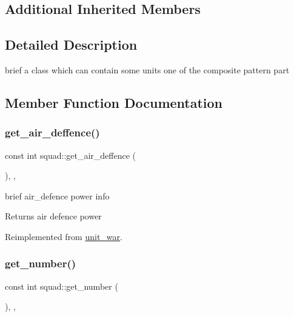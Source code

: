 \subsection*{Additional Inherited Members}


\subsection{Detailed Description}
brief a class which can contain some units one of the composite pattern part 

\subsection{Member Function Documentation}
\mbox{\label{classsquad_ac3655293ec84ecdecd668b6bc0b76ec6}} 
\subsubsection{\texorpdfstring{get\+\_\+air\+\_\+deffence()}{get\_air\_deffence()}}
{\footnotesize\ttfamily const int squad\+::get\+\_\+air\+\_\+deffence (\begin{DoxyParamCaption}{ }\end{DoxyParamCaption})\hspace{0.3cm}{\ttfamily [inline]}, {\ttfamily [override]}, {\ttfamily [virtual]}}

brief air\+\_\+defence power info \begin{DoxyReturn}{Returns}
air defence power 
\end{DoxyReturn}


Reimplemented from \mbox{\hyperlink{classunit__war_af26f2da420a828230a329339bc9ef805}{unit\+\_\+war}}.

\mbox{\label{classsquad_a3b0a216e733b85a86721d4cef8c61f09}} 
\subsubsection{\texorpdfstring{get\+\_\+number()}{get\_number()}}
{\footnotesize\ttfamily const int squad\+::get\+\_\+number (\begin{DoxyParamCaption}{ }\end{DoxyParamCaption})\hspace{0.3cm}{\ttfamily [inline]}, {\ttfamily [override]}, {\ttfamily [virtual]}}

